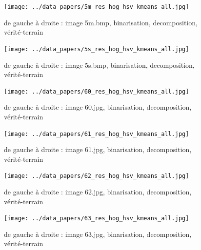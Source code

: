\documentclass{book}
\begin{document}
\begin{figure}[H]
\begin{center}
\texttt{[image: ../data\_papers/5m\_res\_hog\_hsv\_kmeans\_all.jpg]}
\end{center}
\caption{de gauche à droite : image 5m.bmp, binarisation, decomposition, vérité-terrain}
\label{5m}
\end{figure}
\clearpage


\begin{figure}[H]
\begin{center}
\texttt{[image: ../data\_papers/5s\_res\_hog\_hsv\_kmeans\_all.jpg]}
\end{center}
\caption{de gauche à droite : image 5s.bmp, binarisation, decomposition, vérité-terrain}
\label{5s}
\end{figure}
\clearpage


\begin{figure}[H]
\begin{center}
\texttt{[image: ../data\_papers/60\_res\_hog\_hsv\_kmeans\_all.jpg]}
\end{center}
\caption{de gauche à droite : image 60.jpg, binarisation, decomposition, vérité-terrain}
\label{60}
\end{figure}
\clearpage


\begin{figure}[H]
\begin{center}
\texttt{[image: ../data\_papers/61\_res\_hog\_hsv\_kmeans\_all.jpg]}
\end{center}
\caption{de gauche à droite : image 61.jpg, binarisation, decomposition, vérité-terrain}
\label{61}
\end{figure}
\clearpage


\begin{figure}[H]
\begin{center}
\texttt{[image: ../data\_papers/62\_res\_hog\_hsv\_kmeans\_all.jpg]}
\end{center}
\caption{de gauche à droite : image 62.jpg, binarisation, decomposition, vérité-terrain}
\label{62}
\end{figure}
\clearpage


\begin{figure}[H]
\begin{center}
\texttt{[image: ../data\_papers/63\_res\_hog\_hsv\_kmeans\_all.jpg]}
\end{center}
\caption{de gauche à droite : image 63.jpg, binarisation, decomposition, vérité-terrain}
\label{63}
\end{figure}
\clearpage
\end{document}
